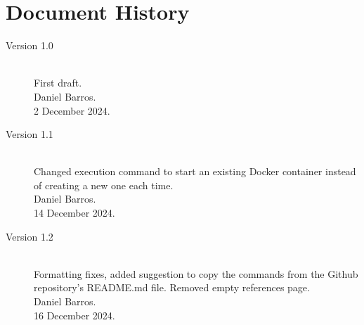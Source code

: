 \documentclass{CSSRforAfrica}
\begin{document}
  

\newpage
\section*{Document History}
\label{document_history}

\begin{description}

\item [Version 1.0]~\\
First draft. \\
Daniel Barros. \\                                     %
2 December 2024.                                                        %

\item [Version 1.1]~\\
Changed execution command to start an existing Docker container instead of creating a new one each time. \\
Daniel Barros. \\                                     %
14 December 2024.                                                        %

\item [Version 1.2]~\\
Formatting fixes, added suggestion to copy the commands from the Github repository's README.md file. Removed empty references page. \\
Daniel Barros. \\                                     %
16 December 2024.                                                        %


\end{description}
\end{document}
